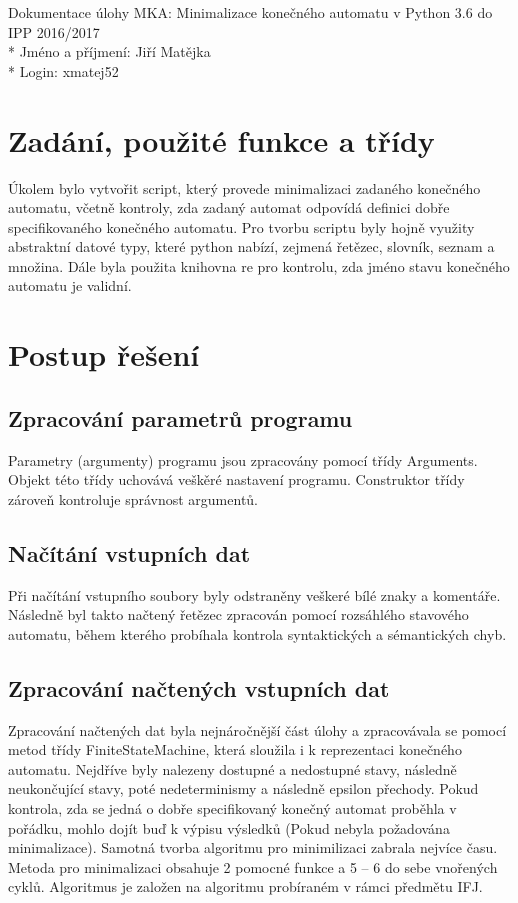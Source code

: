 \documentclass[a4paper, 10pt]{article}
\begin{document}
    \noindent
    Dokumentace úlohy MKA: Minimalizace konečného automatu v Python 3.6 do IPP 2016/2017 \\*
    Jméno a příjmení: Jiří Matějka \\*
    Login: xmatej52

    \section{Zadání, použité funkce a třídy}
        Úkolem bylo vytvořit script, který provede minimalizaci zadaného konečného automatu,
        včetně kontroly, zda zadaný automat odpovídá definici dobře specifikovaného
        konečného automatu.
        Pro tvorbu scriptu byly hojně využity abstraktní datové typy, které python
        nabízí, zejmená řetězec, slovník, seznam a množina. Dále byla použita knihovna
        re pro kontrolu, zda jméno stavu konečného automatu je validní.
    \section{Postup řešení}
        \subsection{Zpracování parametrů programu}
            Parametry (argumenty) programu jsou zpracovány pomocí třídy Arguments.
            Objekt této třídy uchovává veškěré nastavení programu. Construktor třídy
            zároveň kontroluje správnost argumentů.
        \subsection{Načítání vstupních dat}
            Při načítání vstupního soubory byly odstraněny veškeré bílé znaky a
            komentáře. Následně byl takto načtený řetězec zpracován pomocí rozsáhlého
            stavového automatu, během kterého probíhala kontrola syntaktických a
            sémantických chyb.
        \subsection{Zpracování načtených vstupních dat}
            Zpracování načtených dat byla nejnáročnější část úlohy a zpracovávala
            se pomocí metod třídy FiniteStateMachine, která sloužila i k reprezentaci
            konečného automatu. Nejdříve byly
            nalezeny dostupné a nedostupné stavy, následně neukončující stavy, poté
            nedeterminismy a následně epsilon přechody. Pokud kontrola, zda se jedná
            o dobře specifikovaný konečný automat proběhla v pořádku, mohlo dojít buď
            k výpisu výsledků (Pokud nebyla požadována minimalizace). Samotná tvorba
            algoritmu pro minimilizaci zabrala nejvíce času. Metoda pro minimalizaci
            obsahuje 2 pomocné funkce a 5 -- 6 do sebe vnořených cyklů. Algoritmus
            je založen na algoritmu probíraném v rámci předmětu IFJ.
\end{document}
